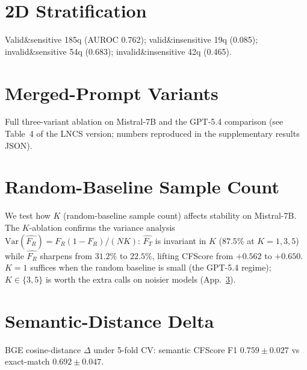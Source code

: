 \documentclass[11pt]{article}
\begin{document}
\section{2D Stratification}
\label{app:2d}
Valid\&sensitive 185q (AUROC 0.762); valid\&insensitive 19q (0.085); invalid\&sensitive 54q (0.683); invalid\&insensitive 42q (0.465).

\section{Merged-Prompt Variants}
\label{app:merged}
Full three-variant ablation on Mistral-7B and the GPT-5.4 comparison (see Table~4 of the LNCS version; numbers reproduced in the supplementary results JSON).

\section{Random-Baseline Sample Count}
\label{app:kablation}
We test how $K$ (random-baseline sample count) affects stability on Mistral-7B. The $K$-ablation confirms the variance analysis $\mathrm{Var}(\widehat{F_R}) = F_R(1-F_R)/(NK)$: $\widehat{F_T}$ is invariant in $K$ ($87.5\%$ at $K{=}1,3,5$) while $\widehat{F_R}$ sharpens from $31.2\%$ to $22.5\%$, lifting CFScore from $+0.562$ to $+0.650$. $K{=}1$ suffices when the random baseline is small (the GPT-5.4 regime); $K \in \{3,5\}$ is worth the extra calls on noisier models (App.~\ref{app:kablation}).

\section{Semantic-Distance Delta}
\label{app:semantic}
BGE cosine-distance $\Delta$ under 5-fold CV: semantic CFScore F1 $0.759{\pm}0.027$ vs exact-match $0.692{\pm}0.047$.
\end{document}
